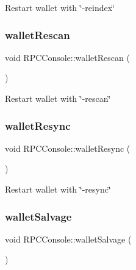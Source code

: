 Restart wallet with \char`\"{}-\/reindex\char`\"{} \mbox{\label{class_r_p_c_console_a87bca6ab058743cda3d716543071ce03}} 
\subsubsection{\texorpdfstring{wallet\+Rescan}{walletRescan}}
{\footnotesize\ttfamily void R\+P\+C\+Console\+::wallet\+Rescan (\begin{DoxyParamCaption}{ }\end{DoxyParamCaption})\hspace{0.3cm}{\ttfamily [slot]}}

Restart wallet with \char`\"{}-\/rescan\char`\"{} \mbox{\label{class_r_p_c_console_a32940def4bbbe99bebd243bace2101da}} 
\subsubsection{\texorpdfstring{wallet\+Resync}{walletResync}}
{\footnotesize\ttfamily void R\+P\+C\+Console\+::wallet\+Resync (\begin{DoxyParamCaption}{ }\end{DoxyParamCaption})\hspace{0.3cm}{\ttfamily [slot]}}

Restart wallet with \char`\"{}-\/resync\char`\"{} \mbox{\label{class_r_p_c_console_ad272e3e402b452d470e5d0cc22dfa838}} 
\subsubsection{\texorpdfstring{wallet\+Salvage}{walletSalvage}}
{\footnotesize\ttfamily void R\+P\+C\+Console\+::wallet\+Salvage (\begin{DoxyParamCaption}{ }\end{DoxyParamCaption})\hspace{0.3cm}{\ttfamily [slot]}}

